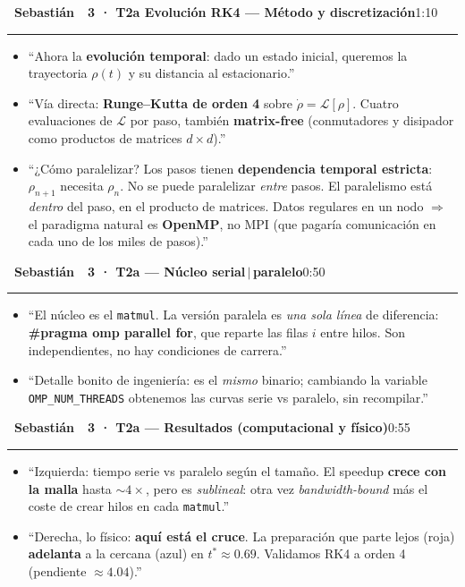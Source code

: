 \documentclass[11pt,a4paper]{article}
\newcommand{\Sb}{\colorbox{seb}{\color{white}\bfseries\footnotesize~Sebastián~}}
\newcommand{\cs}[1]{\textcolor{seb}{\textbf{#1}}}
\newcommand{\blk}[3]{%
  \par\medskip\noindent #1\ \textbf{#2}\hfill\textcolor{soft}{\small #3}\par
  \vspace{-4pt}\textcolor{soft!40}{\rule{\linewidth}{0.4pt}}\par\vspace{-2pt}}
\begin{document}
\blk{\Sb}{3 · T2a Evolución RK4 --- Método y discretización}{1:10}
\begin{itemize}
  \item ``Ahora la \textbf{evolución temporal}: dado un estado inicial, queremos la
    trayectoria $\rho(t)$ y su distancia al estacionario.''
  \item ``Vía directa: \textbf{Runge--Kutta de orden 4} sobre $\dot\rho=\mathcal{L}[\rho]$.
    Cuatro evaluaciones de $\mathcal{L}$ por paso, también \textbf{matrix-free}
    (conmutadores y disipador como productos de matrices $d\times d$).''
  \item ``¿Cómo paralelizar? Los pasos tienen \textbf{dependencia temporal estricta}:
    $\rho_{n+1}$ necesita $\rho_n$. No se puede paralelizar \emph{entre} pasos. El
    paralelismo está \emph{dentro} del paso, en el producto de matrices. Datos
    regulares en un nodo $\Rightarrow$ el paradigma natural es \textbf{OpenMP}, no MPI
    (que pagaría comunicación en cada uno de los miles de pasos).''
\end{itemize}

\blk{\Sb}{3 · T2a --- Núcleo serial\,$\vert$\,paralelo}{0:50}
\begin{itemize}
  \item ``El núcleo es el \texttt{matmul}. La versión paralela es \emph{una sola
    línea} de diferencia: \cs{\#pragma omp parallel for}, que reparte las filas $i$
    entre hilos. Son independientes, no hay condiciones de carrera.''
  \item ``Detalle bonito de ingeniería: es el \emph{mismo} binario; cambiando la
    variable \texttt{OMP\_NUM\_THREADS} obtenemos las curvas serie vs paralelo, sin
    recompilar.''
\end{itemize}

\blk{\Sb}{3 · T2a --- Resultados (computacional y físico)}{0:55}
\begin{itemize}
  \item ``Izquierda: tiempo serie vs paralelo según el tamaño. El speedup
    \textbf{crece con la malla} hasta $\sim4\times$, pero es \emph{sublineal}: otra vez
    \emph{bandwidth-bound} más el coste de crear hilos en cada \texttt{matmul}.''
  \item ``Derecha, lo físico: \textbf{aquí está el cruce}. La preparación que parte
    lejos (roja) \textbf{adelanta} a la cercana (azul) en \cs{$t^*\approx0.69$}.
    Validamos RK4 a orden 4 (pendiente $\approx4.04$).''
\end{itemize}
\end{document}
